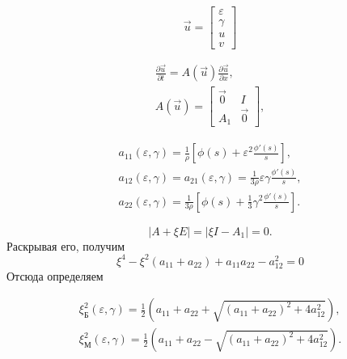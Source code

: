 \documentclass[specialist, subf, href, colorlinks=true, 14pt, final]{disser}
\theoremstyle{definition}
\begin{document}
\[
	\overrightarrow{u} = \left[
		\begin{array}{l}
		\varepsilon\\ \gamma \\ u \\ v
		\end{array}
	    \right]
\]

\addtocounter{equation}{1}
	\begin{equation}\label{eq:2310}
		\begin{array}{l}
			\displaystyle \frac{\partial \overrightarrow{u}}{\partial t} = A(\overrightarrow{u})\displaystyle \frac{\partial \overrightarrow{u}}{\partial x},  \\
			A(\overrightarrow{u}) = \left[
			\begin{array}{cc}
				\overrightarrow{0} & I \\ A_1 & \overrightarrow{0}
			\end{array}
			\right],
		\end{array}
  	\tag{10}
	\end{equation} 

\addtocounter{equation}{1}
	\begin{equation}\label{eq:2311}
		\begin{array}{l}
			a_{11}(\varepsilon, \gamma) = \displaystyle \frac{1}{\rho}\left[ \phi(s) + \varepsilon^2 \displaystyle \frac{\phi'(s)}{s} \right] , \\
			a_{12}(\varepsilon, \gamma) = a_{21}(\varepsilon, \gamma) = \displaystyle \frac{1}{3 \rho} \varepsilon \gamma \displaystyle \frac{\phi'(s)}{s} ,\\
			a_{22}(\varepsilon, \gamma) = \displaystyle \frac{1}{3 \rho}\left[ \phi(s) + \displaystyle \frac{1}{3}\gamma^2 \displaystyle \frac{\phi'(s)}{s} \right].
		\end{array}
  	\tag{11}
	\end{equation}

\[ |A + \xi E| = |\xi I - A_1| = 0.\]
Раскрывая его, получим 
\[ \xi^4 -\xi^2(a_{11} + a_{22}) + a_{11}a_{22} - a_{12}^2 = 0 \]
Отсюда определяем
\addtocounter{equation}{1}
	\begin{equation}\label{eq:2312}
		\begin{array}{l}
			\xi^2_{\text{Б}}(\varepsilon, \gamma) = \frac{1}{2} ( a_{11} + a_{22} + \sqrt{(a_{11} + a_{22})^2 + 4 a_{12}^2 } ), \\
			\xi^2_{\text{М}}(\varepsilon, \gamma) = \frac{1}{2} ( a_{11} + a_{22} - \sqrt{(a_{11} + a_{22})^2 + 4 a_{12}^2 } ).
		\end{array}
  	\tag{12}
	\end{equation}
\end{document}
